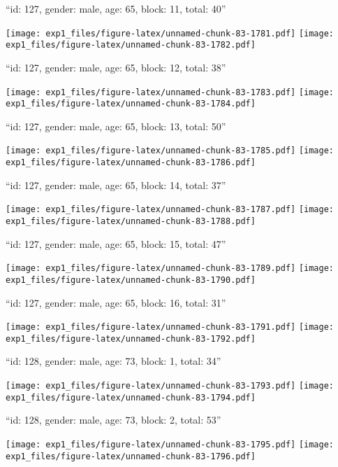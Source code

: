 \documentclass[11pt,,]{article}
\begin{document}
\newpage
[1] 

``id: 127, gender: male, age: 65, block: 11, total: 40''

\texttt{[image: exp1\_files/figure-latex/unnamed-chunk-83-1781.pdf]}
\texttt{[image: exp1\_files/figure-latex/unnamed-chunk-83-1782.pdf]}

\newpage
[1] 

``id: 127, gender: male, age: 65, block: 12, total: 38''

\texttt{[image: exp1\_files/figure-latex/unnamed-chunk-83-1783.pdf]}
\texttt{[image: exp1\_files/figure-latex/unnamed-chunk-83-1784.pdf]}

\newpage
[1] 

``id: 127, gender: male, age: 65, block: 13, total: 50''

\texttt{[image: exp1\_files/figure-latex/unnamed-chunk-83-1785.pdf]}
\texttt{[image: exp1\_files/figure-latex/unnamed-chunk-83-1786.pdf]}

\newpage
[1] 

``id: 127, gender: male, age: 65, block: 14, total: 37''

\texttt{[image: exp1\_files/figure-latex/unnamed-chunk-83-1787.pdf]}
\texttt{[image: exp1\_files/figure-latex/unnamed-chunk-83-1788.pdf]}

\newpage
[1] 

``id: 127, gender: male, age: 65, block: 15, total: 47''

\texttt{[image: exp1\_files/figure-latex/unnamed-chunk-83-1789.pdf]}
\texttt{[image: exp1\_files/figure-latex/unnamed-chunk-83-1790.pdf]}

\newpage
[1] 

``id: 127, gender: male, age: 65, block: 16, total: 31''

\texttt{[image: exp1\_files/figure-latex/unnamed-chunk-83-1791.pdf]}
\texttt{[image: exp1\_files/figure-latex/unnamed-chunk-83-1792.pdf]}

\newpage
[1] 

``id: 128, gender: male, age: 73, block: 1, total: 34''

\texttt{[image: exp1\_files/figure-latex/unnamed-chunk-83-1793.pdf]}
\texttt{[image: exp1\_files/figure-latex/unnamed-chunk-83-1794.pdf]}

\newpage
[1] 

``id: 128, gender: male, age: 73, block: 2, total: 53''

\texttt{[image: exp1\_files/figure-latex/unnamed-chunk-83-1795.pdf]}
\texttt{[image: exp1\_files/figure-latex/unnamed-chunk-83-1796.pdf]}
\end{document}
